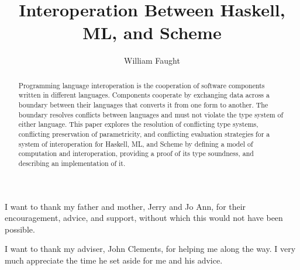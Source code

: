\documentclass[12pt]{ucthesis}
\begin{document}
\title{Interoperation Between Haskell, ML, and Scheme}
\author{William Faught}
\maketitle
\begin{frontmatter}
\copyrightpage
\approvalpage
\begin{abstract}
Programming language interoperation is the cooperation of software components written in different languages.  Components cooperate by exchanging data across a boundary between their languages that converts it from one form to another.  The boundary resolves conflicts between languages and must not violate the type system of either language.  This paper explores the resolution of conflicting type systems, conflicting preservation of parametricity, and conflicting evaluation strategies for a system of interoperation for Haskell, ML, and Scheme by defining a model of computation and interoperation, providing a proof of its type soundness, and describing an implementation of it.
\end{abstract}
\begin{acknowledgements}
\indent\indent I want to thank my father and mother, Jerry and Jo Ann, for their encouragement, advice, and support, without which this would not have been possible.

I want to thank my adviser, John Clements, for helping me along the way.  I very much appreciate the time he set aside for me and his advice.
\end{acknowledgements}
\tableofcontents
\listoffigures
\end{frontmatter}
\pagestyle{plain}
\renewcommand{\baselinestretch}{1.66}







\clearpage


\end{document}
